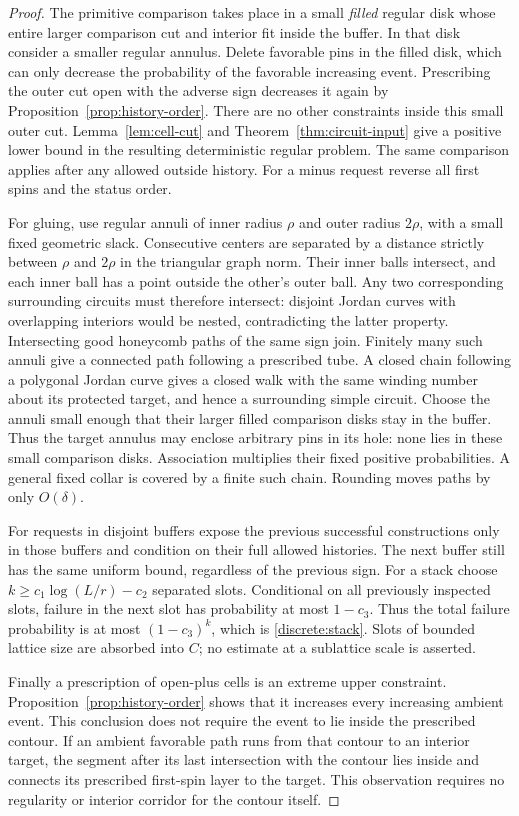 \begin{proof}
The primitive comparison takes place in a small \emph{filled} regular
disk whose entire larger comparison cut and interior fit inside the
buffer. In that disk consider a smaller regular annulus. Delete
favorable pins in the filled disk, which
can only decrease the probability of the favorable increasing event.
Prescribing the outer cut open with the adverse sign decreases it again
by Proposition~\ref{prop:history-order}. There are no other constraints
inside this small outer cut. Lemma~\ref{lem:cell-cut} and
Theorem~\ref{thm:circuit-input} give a positive lower bound in the
resulting deterministic regular problem. The same comparison applies
after any allowed outside history. For a minus request reverse all first
spins and the status order.

For gluing, use regular annuli of inner radius $\rho$ and outer radius
$2\rho$, with a small fixed geometric slack. Consecutive centers are
separated by a distance strictly between $\rho$ and $2\rho$ in the
triangular graph norm. Their inner balls intersect, and each inner ball
has a point outside the other's outer ball. Any two corresponding
surrounding circuits must therefore intersect: disjoint Jordan curves
with overlapping interiors would be nested, contradicting the latter
property. Intersecting good honeycomb paths of the same sign join.
Finitely many such annuli give a connected path following a prescribed
tube. A closed chain following a polygonal Jordan curve gives a closed
walk with the same winding number about its protected target, and hence
a surrounding simple circuit. Choose the annuli small enough that their
larger filled comparison disks stay in the buffer. Thus the target
annulus may enclose arbitrary pins in its hole: none lies in these small
comparison disks. Association multiplies their
fixed positive probabilities. A general fixed collar is covered by a
finite such chain. Rounding moves paths by only $O(\delta)$.

For requests in disjoint buffers expose the previous successful
constructions only in those buffers and condition on their full allowed
histories. The next buffer still has the same uniform bound, regardless
of the previous sign. For a stack choose $k\ge c_1\log(L/r)-c_2$
separated slots. Conditional on all previously inspected slots, failure
in the next slot has probability at most $1-c_3$. Thus the total failure
probability is at most $(1-c_3)^k$, which is
\eqref{discrete:stack}. Slots of bounded lattice size are absorbed into
$C$; no estimate at a sublattice scale is asserted.

Finally a prescription of open-plus cells is an extreme upper constraint.
Proposition~\ref{prop:history-order} shows that it increases every
increasing ambient event. This conclusion does not require the event to
lie inside the prescribed contour. If an ambient favorable path runs
from that contour to an interior target, the segment after its last
intersection with the contour lies inside and connects its prescribed
first-spin layer to the target. This observation requires no regularity
or interior corridor for the contour itself.
\end{proof}

